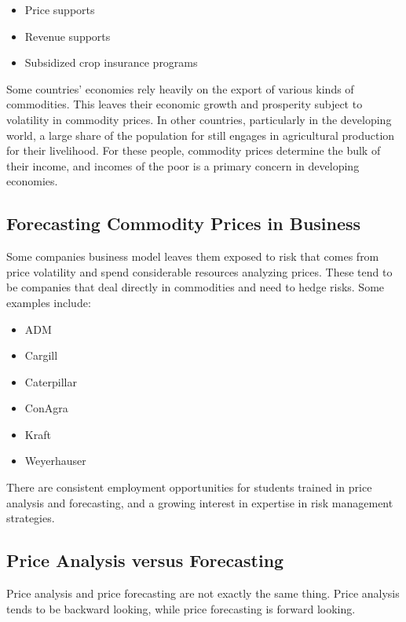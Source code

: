 \documentclass[
  letterpaper,
  DIV=11,
  numbers=noendperiod]{scrreprt}
\providecommand{\tightlist}{%
  \setlength{\itemsep}{0pt}\setlength{\parskip}{0pt}}\usepackage{longtable,booktabs,array}
\begin{document}
\begin{itemize}
\tightlist
\item
  Price supports
\item
  Revenue supports
\item
  Subsidized crop insurance programs
\end{itemize}

Some countries' economies rely heavily on the export of various kinds of
commodities. This leaves their economic growth and prosperity subject to
volatility in commodity prices. In other countries, particularly in the
developing world, a large share of the population for still engages in
agricultural production for their livelihood. For these people,
commodity prices determine the bulk of their income, and incomes of the
poor is a primary concern in developing economies.

\subsection{Forecasting Commodity Prices in
Business}\label{forecasting-commodity-prices-in-business}

Some companies business model leaves them exposed to risk that comes
from price volatility and spend considerable resources analyzing prices.
These tend to be companies that deal directly in commodities and need to
hedge risks. Some examples include:

\begin{itemize}
\tightlist
\item
  ADM
\item
  Cargill
\item
  Caterpillar
\item
  ConAgra
\item
  Kraft
\item
  Weyerhauser
\end{itemize}

There are consistent employment opportunities for students trained in
price analysis and forecasting, and a growing interest in expertise in
risk management strategies.

\subsection{Price Analysis versus
Forecasting}\label{price-analysis-versus-forecasting}

Price analysis and price forecasting are not exactly the same thing.
Price analysis tends to be backward looking, while price forecasting is
forward looking.
\end{document}
